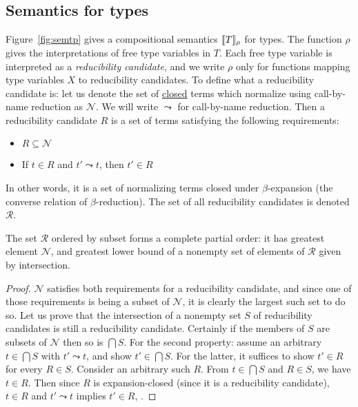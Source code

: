 \documentclass{article}
\begin{document}
\subsection{Semantics for types}
\label{sec:sem}

Figure~\ref{fig:semtp} gives a compositional semantics
$\llbracket T \rrbracket_\rho$ for types.  The function $\rho$ gives the
interpretations of free type variables in $T$.  Each free type
variable is interpreted as a \emph{reducibility candidate}, and we write
$\rho$ only for functions mapping type variables $X$ to reducibility
candidates.  To define what a reducibility candidate is: let us denote
the set of \underline{closed} terms which normalize using call-by-name
reduction as $\mathcal{N}$.  We will write $\leadsto$ for call-by-name
reduction. Then a reducibility candidate $R$ is a set of terms
satisfying the following requirements:
\begin{itemize}
\item $R \subseteq \mathcal{N}$
\item If $t\in R$ and $t'\leadsto t$, then $t'\in R$
\end{itemize}
In other words, it is a set of normalizing terms closed under $\beta$-expansion (the converse relation
of $\beta$-reduction).  The set of all reducibility candidates is denoted $\mathcal{R}$.

\vspace{0.25cm}

\begin{lemma}
  The set $\mathcal{R}$ ordered by subset forms a complete partial
  order: it has greatest element $\mathcal{N}$, and greatest lower bound
  of a nonempty set of elements of $\mathcal{R}$ given by
  intersection.
\end{lemma}

\vspace{0.25cm}

\begin{proof}
  $\mathcal{N}$ satisfies both requirements for a reducibility
  candidate, and since one of those requirements is being a subset of
  $\mathcal{N}$, it is clearly the largest such set to do so.  Let us
  prove that the intersection of a nonempty set $S$ of reducibility
  candidates is still a reducibility candidate.  Certainly if the
  members of $S$ are subsets of $\mathcal{N}$ then so is $\bigcap S$.
  For the second property: assume an arbitrary $t\in\bigcap S$ with
  $t'\leadsto t$, and show $t'\in\bigcap S$.  For the latter, it
  suffices to show $t'\in R$ for every $R\in S$.  Consider an
  arbitrary such $R$.  From $t\in\bigcap S$ and $R \in S$, we have
  $t\in R$.  Then since $R$ is expansion-closed (since it is a reducibility
  candidate), $t \in R$ and
  $t'\leadsto t$ implies $t'\in R$, .
\end{proof}
\end{document}
